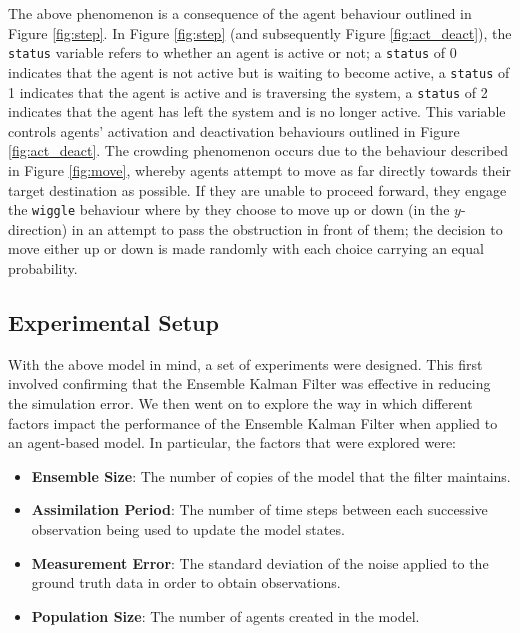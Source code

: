 The above phenomenon is a consequence of the agent behaviour outlined in Figure
\ref{fig:step}.
In Figure \ref{fig:step} (and subsequently Figure \ref{fig:act_deact}), the
\texttt{status} variable refers to whether an agent is active or not; a
\texttt{status} of 0 indicates that the agent is not active but is waiting to
become active, a \texttt{status} of 1 indicates that the agent is active and is
traversing the system, a \texttt{status} of 2 indicates that the agent has left
the system and is no longer active.
This variable controls agents' activation and deactivation behaviours outlined
in Figure \ref{fig:act_deact}.
The crowding phenomenon occurs due to the behaviour described in Figure
\ref{fig:move}, whereby agents attempt to move as far directly towards their
target destination as possible.
If they are unable to proceed forward, they engage the \texttt{wiggle} behaviour
where by they choose to move up or down (in the $y$-direction) in an attempt to
pass the obstruction in front of them; the decision to move either up or down is
made randomly with each choice carrying an equal probability.

\subsection{Experimental Setup}\label{sub:research:experiments}

With the above model in mind, a set of experiments were designed.
This first involved confirming that the Ensemble Kalman Filter was effective in
reducing the simulation error.
We then went on to explore the way in which different factors impact the
performance of the Ensemble Kalman Filter when applied to an agent-based model.
In particular, the factors that were explored were:
\begin{itemize}
    \item \textbf{Ensemble Size}: The number of copies of the model that the
        filter maintains.
    \item \textbf{Assimilation Period}: The number of time steps between each
        successive observation being used to update the model states.
    \item \textbf{Measurement Error}: The standard deviation of the noise
        applied to the ground truth data in order to obtain observations.
    \item \textbf{Population Size}: The number of agents created in the model.
\end{itemize}

